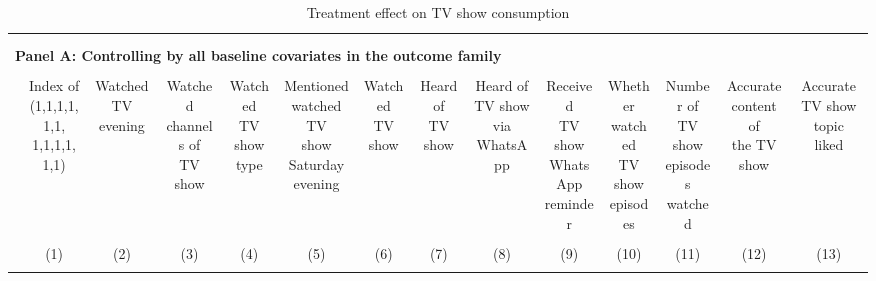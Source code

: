 \documentclass[12pt]{article}
\begin{document}
\begin{table}
\centering 
\vspace*{-1cm}  \caption{Treatment effect on TV show consumption} 
  \label{} 
\scriptsize 
\hspace*{-2cm}\begin{tabular}{@{\extracolsep{0pt}}lccccccccccccc} 
\hline \\[-1.8ex] 
\\[-0.5ex] 
\multicolumn{13}{l}{\textbf{Panel A: Controlling by all baseline covariates in the outcome family}} \\
\hline \\[-1ex] 
 & \shortstack{Index of \\ (1,1,1,1,1,1,\\1,1,1,1,1,1)} & \shortstack{Watched TV \\ evening} & \shortstack{Watched \\channels of \\TV show} & \shortstack{Watched \\TV show \\type} & \shortstack{Mentioned \\watched TV \\show Saturday \\evening} & \shortstack{Watched \\TV show} & \shortstack{Heard of \\TV show} & \shortstack{Heard of \\TV show via \\WhatsApp} & \shortstack{Received \\TV show \\WhatsApp \\reminder} & \shortstack{Whether \\watched \\TV show \\episodes} & \shortstack{Number of \\TV show \\episodes \\watched} & \shortstack{Accurate \\content of \\the TV show} & \shortstack{Accurate \\TV show topic \\liked} \\ 
\\[-1.8ex] & (1) & (2) & (3) & (4) & (5) & (6) & (7) & (8) & (9) & (10) & (11) & (12) & (13)\\
\hline \\[-1.8ex] 

\end{tabular}
\end{table}
\end{document}
